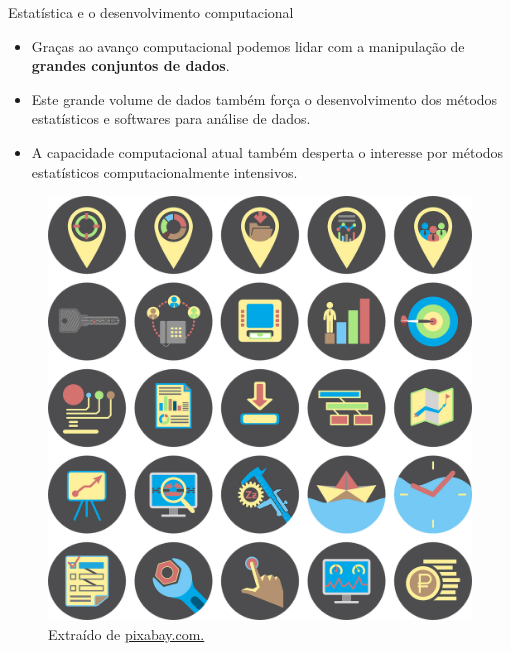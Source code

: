 \documentclass[
  ignorenonframetext,
  serif,
  professionalfont,
  usenames,
  dvipsnames,
  aspectratio = 169]{beamer}
\def\beginAHalfColumn{\begin{minipage}{0.49\textwidth}}%
\def\endColumns{\end{minipage}}%
\begin{document}
\begin{frame}{Estatística e o desenvolvimento computacional}
\protect\hypertarget{estatuxedstica-e-o-desenvolvimento-computacional-1}{}
\beginAHalfColumn

\begin{itemize}
\item
  Graças ao avanço computacional podemos lidar com a manipulação de
  \textbf{grandes conjuntos de dados}.
\item
  Este grande volume de dados também força o desenvolvimento dos métodos
  estatísticos e softwares para análise de dados.
\item
  A capacidade computacional atual também desperta o interesse por
  métodos estatísticos computacionalmente intensivos.
\end{itemize}

\endColumns
\beginAHalfColumn

\begin{figure}

{\centering \includegraphics[width=0.6\linewidth]{./img/ti} 

}

\caption{Extraído de \href{https://cdn.pixabay.com/photo/2015/04/14/23/17/it-business-722950_1280.png}{pixabay.com.}}\label{fig:unnamed-chunk-12}
\end{figure}

\endColumns
\end{frame}
\end{document}

